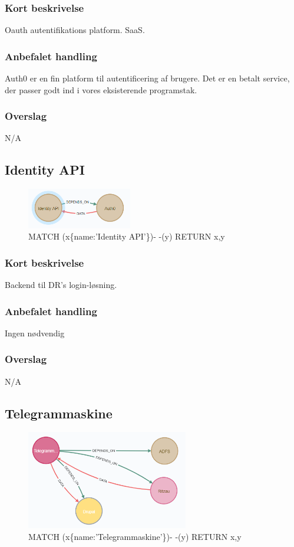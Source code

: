 \documentclass{article}
\begin{document}
\subsubsection{Kort beskrivelse}
Oauth autentifikations platform. SaaS.
\subsubsection{Anbefalet handling}
Auth0 er en fin platform til autentificering af brugere. Det er en betalt service, der passer godt ind i vores eksisterende programstak. 
\subsubsection{Overslag}
N/A


\subsection{Identity API}
\begin{figure}[h]
\includegraphics[width=130pt]{Identity.PNG}
\caption{MATCH (x\{name:'Identity API'\})- -(y) RETURN x,y}
\end{figure}
\subsubsection{Kort beskrivelse}
Backend til DR's login-løsning.
\subsubsection{Anbefalet handling}
Ingen nødvendig
\subsubsection{Overslag}
N/A

\subsection{Telegrammaskine}
\begin{figure}[h]
\includegraphics[width=200pt]{Telegrammaskine.PNG}
\caption{MATCH (x\{name:'Telegrammaskine'\})- -(y) RETURN x,y}
\end{figure}
\end{document}

